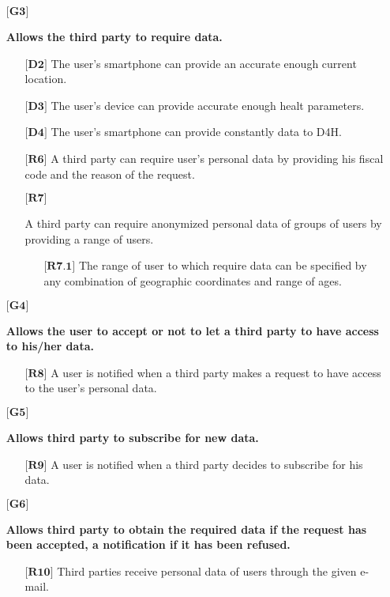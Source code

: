 \begin{itemize}
	\item[${\textbf{[G3]}}$] {\textbf{Allows the third party to require data.}
		\begin{itemize}
			\item[$\textbf{[D2]}$] {The user's smartphone can provide an accurate enough current location.}
			\item[$\textbf{[D3]}$] {The user's device can provide accurate enough healt parameters.}
			\item[$\textbf{[D4]}$] {The user's smartphone can provide constantly data to D4H.}
			\item[$\textbf{[R6]}$] {A third party can require user's personal data by providing his fiscal code and the reason of the request.}
			\item[$\textbf{[R7]}$] {A third party can require anonymized personal data of groups of users by providing a range of users.
			\begin{itemize}
				\item[$\textbf{[R7.1]}$] {The range of user to which require data can be specified by any combination of geographic coordinates and range of ages.}
			\end{itemize}}
		\end{itemize}}


	\item[${\textbf{[G4]}}$] {\textbf{Allows the user to accept or not to let a third party to have access to his/her data.}
		\begin{itemize}	
			\item[$\textbf{[R8]}$] {A user is notified when a third party makes a request to have access to the user's personal data.}
		\end{itemize}}


	\item[${\textbf{[G5]}}$] {\textbf{Allows third party to subscribe for new data.}
		\begin{itemize}
			\item[$\textbf{[R9]}$] {A user is notified when a third party decides to subscribe for his data.}
		\end{itemize}}


	\item[${\textbf{[G6]}}$] {\textbf{Allows third party to obtain the required data if the request has been accepted, a notification if it has been refused.}
		\begin{itemize}
			\item[$\textbf{[R10]}$] {Third parties receive personal data of users through the given e-mail.}
		\end{itemize}}



\end{itemize}
